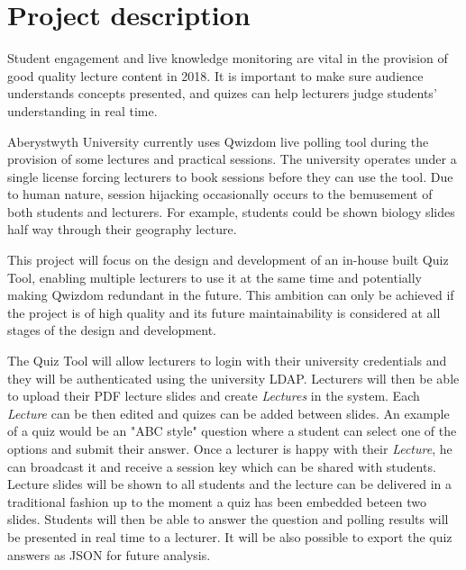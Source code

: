 \documentclass[11pt,fleqn,twoside]{article}
\begin{document}
\wordcount{}

\mmp

\setcounter{tocdepth}{3} %


\section{Project description}
Student engagement and live knowledge monitoring are vital in the provision of good quality
lecture content in 2018. It is important to make sure audience understands concepts presented,
and quizes can help lecturers judge students' understanding in real time.

Aberystwyth University currently uses Qwizdom live polling tool during the provision
of some lectures and practical sessions. The university operates under a single license
forcing lecturers to book sessions before they can use the tool. Due to human nature,
session hijacking occasionally occurs to the bemusement of both students and lecturers.
For example, students could be shown biology slides half way through their geography
lecture.

This project will focus on the design and development of an in-house built Quiz Tool,
enabling multiple lecturers to use it at the same time and potentially making Qwizdom
redundant in the future. This ambition can only be achieved if the project is of
high quality and its future maintainability is considered at all stages of the design
and development.

The Quiz Tool will allow lecturers to login with their university credentials and
they will be authenticated using the university LDAP. Lecturers will then
be able to upload their PDF lecture slides and create \textit{Lectures} in the system.
Each \textit{Lecture} can be then edited and quizes can be added between slides.
An example of a quiz would be an "ABC style" question where a student can select
one of the options and submit their answer. Once a lecturer is happy with their
\textit{Lecture}, he can broadcast it and receive a session key which can be
shared with students. Lecture slides will be shown to all students and the
lecture can be delivered in a traditional fashion up to the moment a quiz
has been embedded beteen two slides. Students will then be able to answer
the question and polling results will be presented in real time to a lecturer.
It will be also possible to export the quiz answers as JSON for future analysis.
\end{document}

